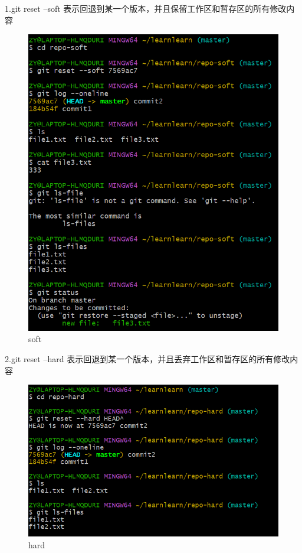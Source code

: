 \documentclass{ctexart}
\begin{document}
	1.git reset --soft 表示回退到某一个版本，并且保留工作区和暂存区的所有修改内容
	\begin{figure}[H]
		\centering
		\includegraphics[scale=0.5]{35}
		\caption{soft}
	\end{figure}
	
	2.git reset --hard 表示回退到某一个版本，并且丢弃工作区和暂存区的所有修改内容
	\begin{figure}[H]
		\centering
		\includegraphics[scale=0.5]{36}
		\caption{hard}
	\end{figure}
	
\end{document}
